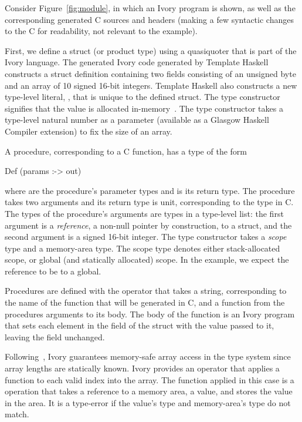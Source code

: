Consider Figure~\ref{fig:module}, in which an Ivory program is shown, as well as
the corresponding generated C sources and headers (making a few syntactic
changes to the C for readability, not relevant to the example).

First, we define a struct (or product type) using a quasiquoter that is part of
the Ivory language.  The generated Ivory code generated by Template
Haskell~\cite{th} constructs a struct definition containing two fields
consisting of an unsigned byte and an array of 10 signed 16-bit integers.
Template Haskell also constructs a new type-level literal, ,
that is unique to the defined struct.  The  type constructor
signifies that the value is allocated in-memory~\cite{memareas}.  The 
type constructor takes a type-level natural number as a parameter (available as
a Glasgow Haskell Compiler extension) to fix the size of an array.

A procedure, corresponding to a C function, has a type of the form
\begin{code}
Def (params :-> out)
\end{code}
\noindent
where  are the procedure's parameter types and  is its return
type.  The procedure  takes two arguments and its return type is
unit, corresponding to the  type in C.  The types of the procedure's
arguments are types in a type-level list: the first argument is a
\emph{reference}, a non-null pointer by construction, to a struct, and the
second argument is a signed 16-bit integer.  The  type constructor takes
a \emph{scope} type and a memory-area type.  The scope type denotes either
stack-allocated scope, or global (and statically allocated) scope.  In the
example, we expect the reference to be to a global.


Procedures are defined with the  operator that takes a string,
corresponding to the name of the function that will be generated in C, and a
function from the procedures arguments to its body.  The body of the function is
an Ivory program that sets each element in the  field of the struct with
the value  passed to it, leaving the  field unchanged.

Following~\cite{memareas}, Ivory guarantees memory-safe array access in the type
system since array lengths are statically known.  Ivory provides an 
operator that applies a function to each valid index into the array.  The
function applied in this case is a  operation that takes a reference
to a memory area, a value, and stores the value in the area.  It is a type-error
if the value's type and memory-area's type do not match.

